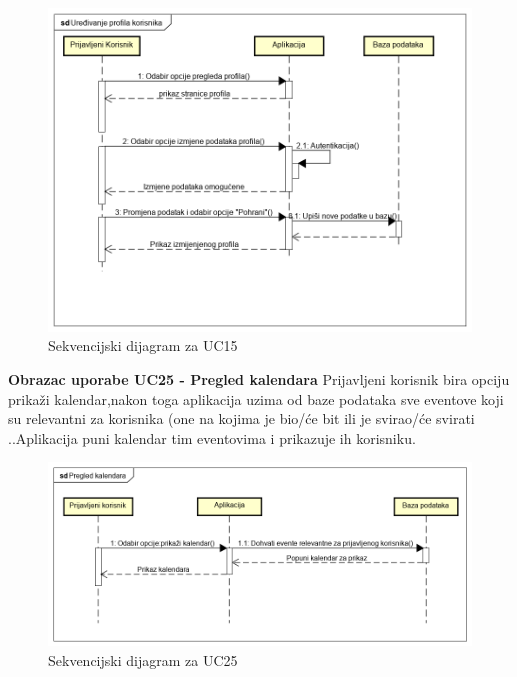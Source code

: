 				
				\begin{figure}[H]
					\begin{center}
						\includegraphics[width=15cm]{slike/uc15_fixed.PNG}
					\end{center}
					\caption{Sekvencijski dijagram za UC15}
					\label{fig:uc15}
				\end{figure}
				
				
				
			\eject
				 \textbf{Obrazac uporabe UC25 - Pregled kalendara}
			\newline
			{Prijavljeni korisnik bira opciju prikaži kalendar,nakon toga aplikacija uzima od baze podataka sve  eventove koji su relevantni za korisnika (one na kojima je bio/će bit ili je svirao/će svirati  .}.Aplikacija puni kalendar tim eventovima i prikazuje ih korisniku.\\
			
			\begin{figure}[H]
				\begin{center}
					\includegraphics[width=15cm]{slike/uc25.PNG}
				\end{center}
				\caption{Sekvencijski dijagram za UC25}
				\label{fig:uc25}
			\end{figure}
	
